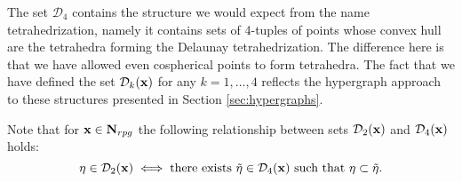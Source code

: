 The set $\mathcal D_4$ contains the structure we would expect from the name tetrahedrization, namely it contains sets of 4-tuples of points whose convex hull are the tetrahedra forming the Delaunay tetrahedrization. The difference here is that we have allowed even cospherical points to form tetrahedra. The fact that we have defined the set $\mathcal D_k({\mathbf{x}})$ for any $k=1,\dots,4$ reflects the hypergraph approach to these structures presented in Section \ref{sec:hypergraphs}.

Note that for ${\mathbf{x}}\in\mathbf N_{rpg}$ the following relationship between sets $\mathcal D_2({\mathbf{x}})$ and $\mathcal D_4({\mathbf{x}})$ holds:
\begin{equation}\label{eq:d2d4}\eta \in \mathcal D_2({\mathbf{x}}) \iff \text{there exists } \tilde\eta \in \mathcal D_4({\mathbf{x}}) \text{ such that } \eta\subset \tilde \eta.\end{equation}



% 


